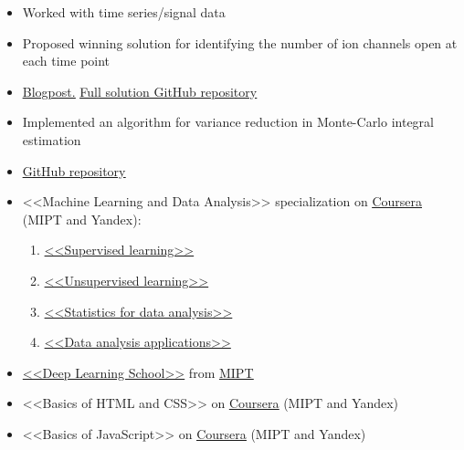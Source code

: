 

\begin{itemize}
	\item Worked with time series/signal data
	\item Proposed winning solution for identifying the number of ion channels open at each time point
	\item \href{https://www.kaggle.com/c/liverpool-ion-switching/discussion/153991}{\underline{Blogpost.}} \href{https://github.com/stdereka/liverpool-ion-switching}{\underline{Full solution GitHub repository}}
\end{itemize}

\divider

\begin{itemize}
	\item Implemented an algorithm for variance reduction in Monte-Carlo integral estimation
	\item \href{https://github.com/stdereka/MAP361P}{\underline{GitHub repository}}
\end{itemize}


\begin{itemize}
\item <<Machine Learning and Data Analysis>> specialization on \href{https://www.coursera.org/specializations/machine-learning-data-analysis?}{\underline{Coursera}} (MIPT and Yandex):
\begin{enumerate}
	\item \href{https://www.coursera.org/learn/supervised-learning?specialization=machine-learning-data-analysis}{<<Supervised learning>>}
	\item \href{https://www.coursera.org/learn/unsupervised-learning?specialization=machine-learning-data-analysis}{<<Unsupervised learning>>}
	\item \href{https://www.coursera.org/learn/stats-for-data-analysis/}{<<Statistics for data analysis>>}
	\item \href{https://www.coursera.org/learn/data-analysis-applications/}{<<Data analysis applications>>}
\end{enumerate}
\divider
\item \href{https://en.dlschool.org/}{<<Deep Learning School>>} from \href{https::/mipt.ru/en}{\underline{MIPT}}
\item <<Basics of HTML and CSS>> on \href{https://www.coursera.org/learn/snovy-html-i-css?specialization=razrabotka-interfeysov}{\underline{Coursera}} (MIPT and Yandex)
\item <<Basics of JavaScript>> on \href{https://www.coursera.org/learn/javascript-osnovy-i-funktsii}{\underline{Coursera}} (MIPT and Yandex)

\end{itemize}




